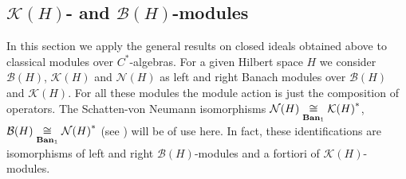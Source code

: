 
\subsection{
    \texorpdfstring{$\mathcal{K}(H)$}{K(H)}- and
    \texorpdfstring{$\mathcal{B}(H)$}{B(H)}-modules}\label{
SubSectionKHAndBHModules}

In this section we apply the general results on closed ideals obtained above to classical
modules over $C^*$-algebras.  For a given Hilbert space $H$ we consider
$\mathcal{B}(H)$, $\mathcal{K}(H)$ and $\mathcal{N}(H)$ as left and right Banach
modules over $\mathcal{B}(H)$ and $\mathcal{K}(H)$. For all these modules the module
action is just the composition of operators. The Schatten-von Neumann
isomorphisms $\mathcal{N}(H)\mathrel{\mathop{\cong}\limits_{\mathbf{Ban}_1}}{\mathcal{K}(H)}^*$,
$\mathcal{B}(H)\mathrel{\mathop{\cong}\limits_{\mathbf{Ban}_1}}{\mathcal{N}(H)}^*$ (see
\cite[theorems II.1.6, II.1.8]{TakThOpAlgVol1}) will be of use here. 
In fact, these identifications are isomorphisms of left and right 
$\mathcal{B}(H)$-modules and a fortiori of $\mathcal{K}(H)$-modules.

